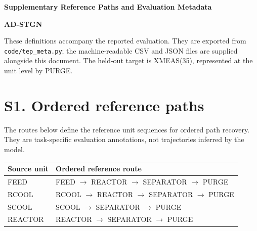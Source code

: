 \documentclass[11pt,a4paper]{article}
\begin{document}
\begin{center}\Large\bfseries Supplementary Reference Paths and Evaluation Metadata\end{center}
\textbf{AD-STGN}\par
These definitions accompany the reported evaluation. They are exported from \texttt{code/tep\_meta.py}; the machine-readable CSV and JSON files are supplied alongside this document. The held-out target is XMEAS(35), represented at the unit level by PURGE.
\section*{S1. Ordered reference paths}
The routes below define the reference unit sequences for ordered path recovery. They are task-specific evaluation annotations, not trajectories inferred by the model.
\begin{center}\small
\begin{tabular}{ll}\toprule Source unit & Ordered reference route \\\midrule
FEED & FEED $\rightarrow$ REACTOR $\rightarrow$ SEPARATOR $\rightarrow$ PURGE \\
RCOOL & RCOOL $\rightarrow$ REACTOR $\rightarrow$ SEPARATOR $\rightarrow$ PURGE \\
SCOOL & SCOOL $\rightarrow$ SEPARATOR $\rightarrow$ PURGE \\
REACTOR & REACTOR $\rightarrow$ SEPARATOR $\rightarrow$ PURGE \\
\bottomrule\end{tabular}\end{center}
\end{document}
